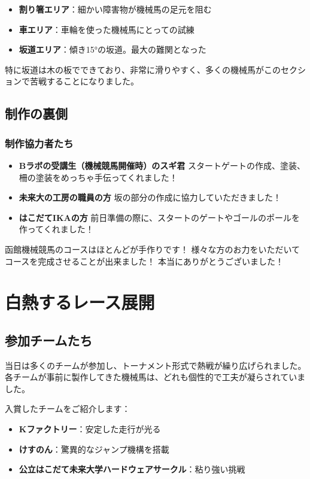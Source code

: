 \begin{itemize}
  \item \textbf{割り箸エリア}：細かい障害物が機械馬の足元を阻む
  \item \textbf{車エリア}：車輪を使った機械馬にとっての試練
  \item \textbf{坂道エリア}：傾き15°の坂道。最大の難関となった
\end{itemize}

特に坂道は木の板でできており、非常に滑りやすく、多くの機械馬がこのセクションで苦戦することになりました。

\section{制作の裏側}

\subsection{制作協力者たち}
\begin{itemize}
  \item \textbf{Bラボの受講生（機械競馬開催時）のスギ君}  
  スタートゲートの作成、塗装、柵の塗装をめっちゃ手伝ってくれました！
  
  \item \textbf{未来大の工房の職員の方}  
  坂の部分の作成に協力していただきました！
  
  \item \textbf{はこだてIKAの方}  
  前日準備の際に、スタートのゲートやゴールのポールを作ってくれました！
\end{itemize}


函館機械競馬のコースはほとんどが手作りです！
様々な方のお力をいただいてコースを完成させることが出来ました！  
本当にありがとうございました！

\chapter{白熱するレース展開}
\section{参加チームたち}
当日は多くのチームが参加し、トーナメント形式で熱戦が繰り広げられました。  
各チームが事前に製作してきた機械馬は、どれも個性的で工夫が凝らされていました。

入賞したチームをご紹介します：
\begin{itemize}
  \item \textbf{Kファクトリー}：安定した走行が光る
  \item \textbf{けすのん}：驚異的なジャンプ機構を搭載
  \item \textbf{公立はこだて未来大学ハードウェアサークル}：粘り強い挑戦
\end{itemize}

